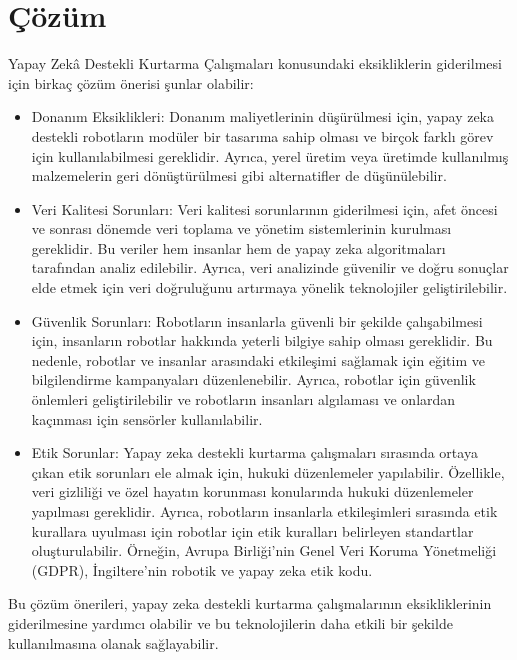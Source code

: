 \documentclass{article}
\begin{document}
\section*{Çözüm}
Yapay Zekâ Destekli Kurtarma Çalışmaları konusundaki eksikliklerin giderilmesi için birkaç çözüm önerisi şunlar olabilir:
\begin{itemize}
    \item Donanım Eksiklikleri: Donanım maliyetlerinin düşürülmesi için, yapay zeka destekli robotların modüler bir tasarıma sahip olması ve birçok farklı görev için kullanılabilmesi gereklidir. Ayrıca, yerel üretim veya üretimde kullanılmış malzemelerin geri dönüştürülmesi gibi alternatifler de düşünülebilir.
    \item Veri Kalitesi Sorunları: Veri kalitesi sorunlarının giderilmesi için, afet öncesi ve sonrası dönemde veri toplama ve yönetim sistemlerinin kurulması gereklidir. Bu veriler hem insanlar hem de yapay zeka algoritmaları tarafından analiz edilebilir. Ayrıca, veri analizinde güvenilir ve doğru sonuçlar elde etmek için veri doğruluğunu artırmaya yönelik teknolojiler geliştirilebilir.
    \item Güvenlik Sorunları: Robotların insanlarla güvenli bir şekilde çalışabilmesi için, insanların robotlar hakkında yeterli bilgiye sahip olması gereklidir. Bu nedenle, robotlar ve insanlar arasındaki etkileşimi sağlamak için eğitim ve bilgilendirme kampanyaları düzenlenebilir. Ayrıca, robotlar için güvenlik önlemleri geliştirilebilir ve robotların insanları algılaması ve onlardan kaçınması için sensörler kullanılabilir.
    \item Etik Sorunlar: Yapay zeka destekli kurtarma çalışmaları sırasında ortaya çıkan etik sorunları ele almak için, hukuki düzenlemeler yapılabilir. Özellikle, veri gizliliği ve özel hayatın korunması konularında hukuki düzenlemeler yapılması gereklidir. Ayrıca, robotların insanlarla etkileşimleri sırasında etik kurallara uyulması için robotlar için etik kuralları belirleyen standartlar oluşturulabilir. Örneğin, Avrupa Birliği'nin Genel Veri Koruma Yönetmeliği (GDPR), İngiltere'nin robotik ve yapay zeka etik kodu.
\end{itemize}
Bu çözüm önerileri, yapay zeka destekli kurtarma çalışmalarının eksikliklerinin giderilmesine yardımcı olabilir ve bu teknolojilerin daha etkili bir şekilde kullanılmasına olanak sağlayabilir.
\end{document}
